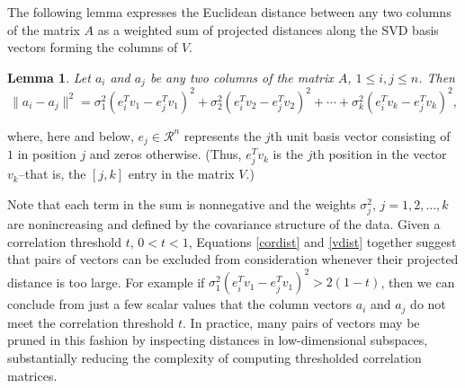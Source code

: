 \documentclass{article}
\newtheorem{lemma}[theorem]{Lemma}
\newenvironment{proof}[1][Proof]{\begin{trivlist}
\item[\hskip \labelsep {\bfseries #1}]}{\end{trivlist}}
\numberwithin{algorithmctr}{section}
\begin{document}
The following lemma expresses the Euclidean distance between any two columns of
the matrix $A$ as a weighted sum of projected distances along the SVD
basis vectors forming the columns of $V$.
\begin{lemma}
\label{sumlemma}
Let $a_i$ and $a_j$
be any two columns of the matrix
$A$, $1\le i,j\le n$. Then
\begin{equation}\label{vdist}
\|a_i - a_j\|^2 =
\sigma_1^2 (e_i^Tv_{1} - e_j^Tv_{1})^2 + 
\sigma_2^2 (e_i^Tv_{2} - e_j^Tv_{2})^2 + \cdots + 
\sigma_k^2 (e_i^Tv_{k} - e_j^Tv_{k})^2,
\end{equation}
\end{lemma}
where, here and below, $e_{j}\in\mathcal{R}^n$ represents the $j$th unit basis
vector consisting of $1$ in position $j$ and zeros otherwise.
(Thus, $e_j^Tv_{k}$ is the $j$th position in the vector $v_k$--that is, the
$[j,k]$ entry in the matrix $V$.)


Note that each term in the sum is nonnegative and the weights $\sigma_j^2$,
$j=1,2,\ldots,k$ are nonincreasing and defined by the covariance structure of
the data.  Given a correlation threshold $t$, $0<t<1$, Equations \ref{cordist}
and \ref{vdist} together suggest that pairs of vectors can be excluded from
consideration whenever their projected distance is too large.  For example if
$\sigma_1^2 (e_i^Tv_{1} - e_j^Tv_{1})^2 > 2(1-t)$, then we can conclude from
just a few scalar values that the column vectors $a_i$ and $a_j$ do not meet the
correlation threshold $t$.
In practice, many pairs of vectors may be pruned in this fashion by
inspecting distances in low-dimensional subspaces, substantially reducing the
complexity of computing thresholded correlation matrices.
\end{document}
